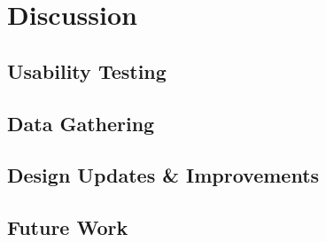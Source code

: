 \chapter{Discussion}

\section{Usability Testing}
\section{Data Gathering}
\section{Design Updates & Improvements}
\section{Future Work}


